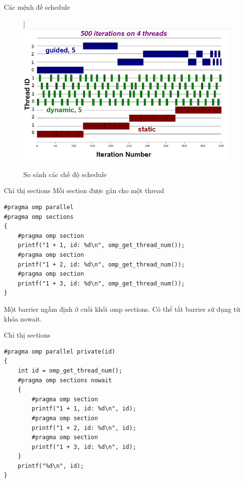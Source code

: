 \documentclass[10pt]{beamer}
\theoremstyle{remark}
\numberwithin{algocf}{section}
\numberwithin{equation}{section}
\numberwithin{dl}{section}
\numberwithin{figure}{section}
\begin{document}
\begin{frame}{Các mệnh đề schedule}
    \begin{figure}[[H]]
        \centering
        \includegraphics[width=0.8\linewidth]{figures/OpenMP/Schedule_Modes_Comparison.png}
        \caption{So sánh các chế độ schedule}
    \end{figure}
\end{frame}

\begin{frame}[fragile]{Chỉ thị sections}
    Mỗi section được gán cho một thread
    \begin{verbatim}
#pragma omp parallel
#pragma omp sections
{
    #pragma omp section
    printf("1 + 1, id: %d\n", omp_get_thread_num());
    #pragma omp section
    printf("1 + 2, id: %d\n", omp_get_thread_num());
    #pragma omp section
    printf("1 + 3, id: %d\n", omp_get_thread_num());
}
    \end{verbatim}

    Một barrier ngầm định ở cuối khối omp sections.
    Có thể tắt barrier sử dụng từ khóa nowait.
\end{frame}

\begin{frame}[fragile]{Chỉ thị sections}
    \begin{verbatim}
#pragma omp parallel private(id)
{
    int id = omp_get_thread_num();
    #pragma omp sections nowait
    {
        #pragma omp section
        printf("1 + 1, id: %d\n", id);
        #pragma omp section
        printf("1 + 2, id: %d\n", id);
        #pragma omp section
        printf("1 + 3, id: %d\n", id);
    }
    printf("%d\n", id);
}
    \end{verbatim}
\end{frame}
\end{document}
